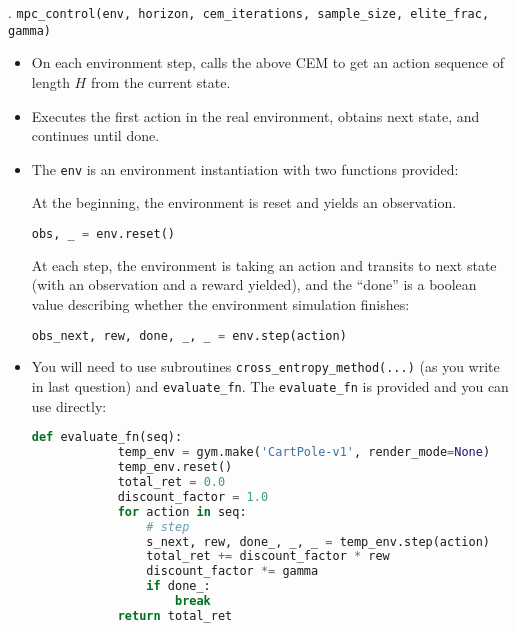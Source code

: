 \documentclass{article}
\begin{document}
. \texttt{mpc\_control(env, horizon, cem\_iterations, sample\_size, elite\_frac, gamma)}
\begin{itemize}
    \item On each environment step, calls the above CEM to get an action sequence of length $H$ from the current state.
    \item Executes the first action in the real environment, obtains next state, and continues until done.
    \item The \texttt{env} is an environment instantiation with two functions provided:
    
At the beginning, the environment is reset and yields an observation.    
\begin{lstlisting}[language=Python]
obs, _ = env.reset()
\end{lstlisting}
At each step, the environment is taking an action and transits to next state (with an observation and a reward yielded), and the ``done'' is a boolean value describing whether the environment simulation finishes:
\begin{lstlisting}[language=Python]
obs_next, rew, done, _, _ = env.step(action)
\end{lstlisting}
    \item You will need to use subroutines \texttt{cross\_entropy\_method(...)} (as you write in last question) and \texttt{evaluate\_fn}. The \texttt{evaluate\_fn} is provided and you can use directly:
    \begin{lstlisting}[language=Python]
        def evaluate_fn(seq):
            temp_env = gym.make('CartPole-v1', render_mode=None)
            temp_env.reset()
            total_ret = 0.0
            discount_factor = 1.0
            for action in seq:
                # step
                s_next, rew, done_, _, _ = temp_env.step(action)
                total_ret += discount_factor * rew
                discount_factor *= gamma
                if done_:
                    break
            return total_ret
\end{lstlisting}
\end{itemize}
\end{document}
